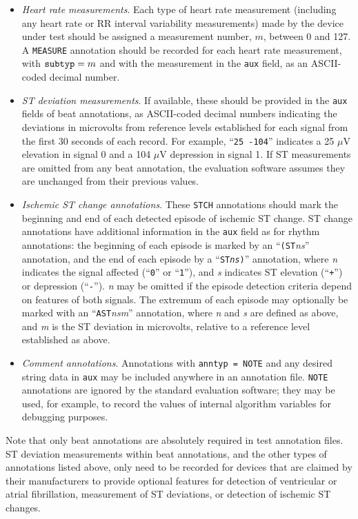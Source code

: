 \documentclass[twoside]{article}
\begin{document}
\begin{itemize}
   \item {\em Heart rate measurements}.  Each type of heart rate measurement
(including any heart rate or RR interval variability measurements) made by the
device under test should be assigned a measurement number, $m$, between 0 and
127.  A {\tt MEASURE} annotation should be recorded for each heart rate
measurement, with ${\tt subtyp} = m$ and with the measurement in the {\tt aux}
field, as an ASCII-coded decimal number.

   \item {\em ST deviation measurements}.  If available, these should
be provided in the {\tt aux} fields of beat annotations, as
ASCII-coded decimal numbers indicating the deviations in microvolts
from reference levels established for each signal from the first 30
seconds of each record.  For example, ``{\tt 25 -104}'' indicates a 25
$\mu$V elevation in signal 0 and a 104 $\mu$V depression in signal 1.
If ST measurements are omitted from any beat annotation, the
evaluation software assumes they are unchanged from their previous
values.

   \item {\em Ischemic ST change annotations}.  These {\tt STCH} annotations
should mark the beginning and end of each detected episode of ischemic ST
change.  ST change annotations have additional information in the {\tt aux}
field as for rhythm annotations: the beginning of each episode is marked by an
``{\tt (ST}{\it ns}'' annotation, and the end of each episode by a
``{\tt ST{\it ns})}'' annotation, where {\it n} indicates the signal affected
 (``{\tt 0}'' or ``{\tt 1}''), and {\it s} indicates ST elevation (``{\tt +}'')
or depression (``{\tt -}'').  {\it n} may be omitted if the episode detection
criteria depend on features of both signals.  The extremum of each episode may
optionally be marked with an ``{\tt AST}{\it nsm}'' annotation, where {\it n}
and {\it s} are defined as above, and {\it m} is the ST deviation in
microvolts, relative to a reference level established as above.

   \item {\em Comment annotations}.  Annotations with {\tt anntyp = NOTE}
and any desired string data in {\tt aux} may be included anywhere in
an annotation file.  {\tt NOTE} annotations are ignored by the
standard evaluation software;  they may be used, for example, to
record the values of internal algorithm variables for debugging purposes.
\end{itemize}
Note that only beat annotations are absolutely required in test annotation
files.  ST deviation measurements within beat annotations, and the other
types of annotations listed above, only need to be recorded for devices
that are claimed by their manufacturers to provide optional features for
detection of ventricular or atrial fibrillation, measurement of ST deviations,
or detection of ischemic ST changes.
\end{document}
